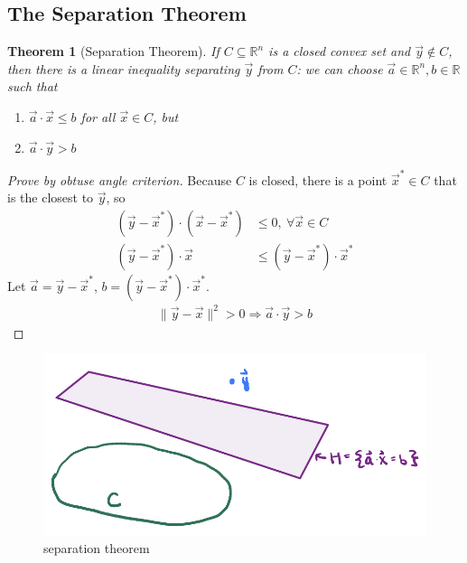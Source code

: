 \documentclass[11pt,a4paper]{article}
\newtheorem{theorem}{Theorem}
\begin{document}
\subsection{The Separation Theorem}
\begin{theorem}[Separation Theorem]
    If $C\subseteq \mathbb{R}^n$ is a closed convex set and $\vec{y}\notin C$, then there is a linear inequality separating $\vec{y}$ from $C$: we can choose $\vec{a}\in \mathbb{R}^n, b\in \mathbb{R}$ such that
    \begin{enumerate}[$\bullet$]
        \item $\vec{a}\cdot \vec{x}\leq b$ for all $\vec{x}\in C$, but
        \item $\vec{a}\cdot \vec{y}> b$
    \end{enumerate}
\end{theorem}
\begin{proof}[Prove by obtuse angle criterion]
    Because $C$ is closed, there is a point $\vec{x}^*\in C$ that is the closest to $\vec{y}$, so
    \begin{equation}
        \begin{aligned}
            (\vec{y}-\vec{x}^*)\cdot (\vec{x}-\vec{x}^*)&\leq 0,\ \forall \vec{x}\in C\\
            (\vec{y}-\vec{x}^*)\cdot \vec{x}&\leq (\vec{y}-\vec{x}^*)\cdot \vec{x}^*
        \end{aligned}
        \nonumber
    \end{equation}
    Let $\vec{a}=\vec{y}-\vec{x}^*$, $b=(\vec{y}-\vec{x}^*)\cdot \vec{x}^*$.
    \begin{equation}
        \begin{aligned}
            \|\vec{y}-\vec{x}\|^2>0 \Rightarrow \vec{a}\cdot\vec{y}>b
        \end{aligned}
        \nonumber
    \end{equation}
\end{proof}
\begin{center}\begin{figure}[htbp]
    \centering
    \includegraphics[scale=0.3]{separating.png}
    \caption{separation theorem}
    \label{}
\end{figure}\end{center}
\end{document}
